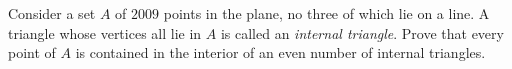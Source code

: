 Consider a set $A$ of $2009$ points in the plane, no three of which lie on a line.
A triangle whose vertices all lie in $A$ is called an \emph{internal triangle}.
Prove that every point of $A$ is contained in the interior of an even number of internal triangles.

